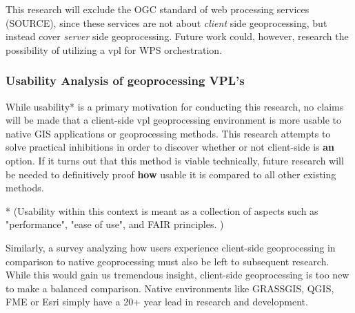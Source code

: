 This research will exclude the OGC standard of web processing services (SOURCE), since these services are not about \emph{client} side geoprocessing, but instead cover \emph{server} side geoprocessing. 
Future work could, however, research the possibility of utilizing a vpl for WPS orchestration. 



\subsubsection*{Usability Analysis of geoprocessing VPL's} %

While usability* is a primary motivation for conducting this research, no claims will be made that a client-side vpl geoprocessing environment is more usable to native GIS applications or geoprocessing methods. This research attempts to solve practical inhibitions in order to discover whether or not client-side is \textbf{an} option. If it turns out that this method is viable technically, future research will be needed to definitively proof \textbf{how} usable it is compared to all other existing methods.  


* (Usability within this context is meant as a collection of aspects such as "performance", "ease of use", and FAIR principles. )

Similarly, a survey analyzing how users experience client-side geoprocessing in comparison to native geoprocessing must also be left to subsequent research. While this would gain us tremendous insight, client-side geoprocessing is too new to make a balanced comparison. Native environments like GRASSGIS, QGIS, FME or Esri simply have a 20+ year lead in research and development. 







